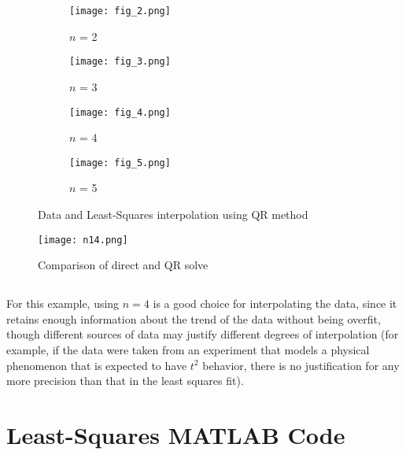 \documentclass{template}
\begin{document}
\begin{figure}[h]
    \centering
    \begin{subfigure}{0.48\textwidth}
        \texttt{[image: fig\_2.png]}
        \caption{$n$ = 2}
        \label{}
    \end{subfigure}
    \begin{subfigure}{0.48\textwidth}
        \texttt{[image: fig\_3.png]}
        \caption{$n$ = 3}
        \label{}
    \end{subfigure}

    \begin{subfigure}{0.48\textwidth}
        \texttt{[image: fig\_4.png]}
        \caption{$n$ = 4}
        \label{}
    \end{subfigure}
    \begin{subfigure}{0.48\textwidth}
        \texttt{[image: fig\_5.png]}
        \caption{$n$ = 5}
        \label{}
    \end{subfigure}
    \caption{Data and Least-Squares interpolation using QR method}
    \label{fig:increasing-n}
\end{figure}


\begin{figure}[h]
  \centering
  \texttt{[image: n14.png]}
  \caption{Comparison of direct and QR solve}
  \label{fig:method-comparison}
\end{figure}

\subsection{}

For this example, using $n=4$ is a good choice for interpolating the data, since it retains enough information about the trend of the data without being overfit, though different sources of data may justify different degrees of interpolation (for example, if the data were taken from an experiment that models a physical phenomenon that is expected to have $t^2$ behavior, there is no justification for any more precision than that in the least squares fit).

\clearpage
\appendix
\section{Least-Squares MATLAB Code}\label{sec:lsqr}
\end{document}
